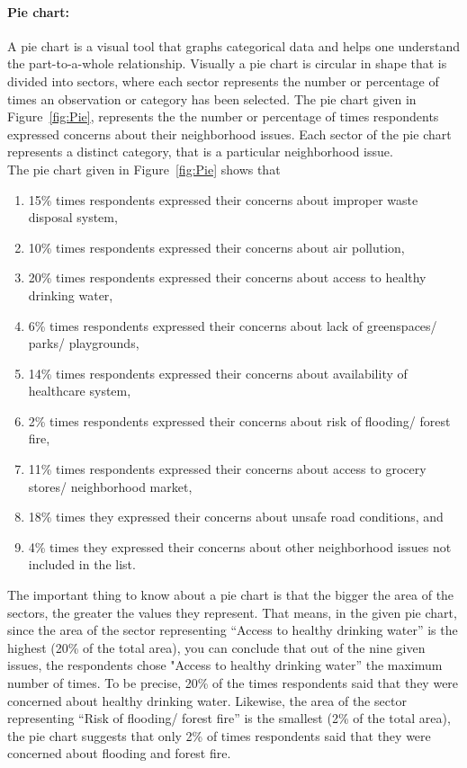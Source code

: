 \documentclass[a4paper, 11pt]{article}
\begin{document}
	\paragraph{Pie chart:} A pie chart is a visual tool that graphs categorical data and helps one understand the part-to-a-whole relationship. Visually a pie chart is circular in shape that is divided into sectors, where each sector represents the number or percentage of times an observation or category has been selected. The pie chart given in Figure~\ref{fig:Pie}, represents the the number or percentage of times respondents expressed concerns about their neighborhood issues. Each sector of the pie chart represents a distinct category, that is a particular neighborhood issue. \\[1ex]
	The pie chart given in Figure~\ref{fig:Pie} shows that 
	\begin{enumerate}[label=(\alph*), noitemsep]
		\item 
	15\% times respondents expressed their concerns about improper waste disposal system, 
		\item 
	10\% times respondents expressed their concerns about air pollution, 
	\item 
	20\% times respondents expressed their concerns about access to healthy drinking water, 
	\item 
	6\% times respondents expressed their concerns about lack of greenspaces/ parks/ playgrounds, 
	\item 
	14\% times respondents expressed their concerns about availability of healthcare system, 
	\item 
	2\% times respondents expressed their concerns about risk of flooding/ forest fire, 
	\item 
	11\% times respondents expressed their concerns about access to grocery stores/ neighborhood market, 
	\item
	18\% times they expressed their concerns about unsafe road conditions, and
	\item
	4\% times they expressed their concerns about other neighborhood issues not included in the list.
	\end{enumerate}
	The important thing to know about a pie chart is that the bigger the area of the sectors, the greater the values they represent. That means, in the given pie chart, since the area of the sector representing “Access to healthy drinking water” is the highest (20\% of the total area), you can conclude that out of the nine given issues, the respondents chose "Access to healthy drinking water” the maximum number of times. To be precise, 20\% of the times respondents said that they were concerned about healthy drinking water. Likewise, the area of the sector representing “Risk of flooding/ forest fire” is the smallest (2\% of the total area), the pie chart suggests that only 2\% of times respondents said that they were concerned about flooding and forest fire. 
\end{document}
